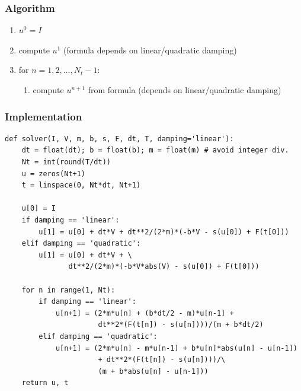 \documentclass{beamer}
\begin{document}
\begin{frame}
\frametitle{Algorithm}

\begin{enumerate}
 \item $u^0=I$

 \item compute $u^1$ (formula depends on linear/quadratic damping)

 \item for $n=1,2,\ldots,N_t-1$:
\begin{enumerate}

   \item compute $u^{n+1}$ from formula (depends on linear/quadratic damping)
\end{enumerate}

\noindent
\end{enumerate}

\noindent
\end{frame}

\begin{frame}
\frametitle{Implementation}

\begin{verbatim}
def solver(I, V, m, b, s, F, dt, T, damping='linear'):
    dt = float(dt); b = float(b); m = float(m) # avoid integer div.
    Nt = int(round(T/dt))
    u = zeros(Nt+1)
    t = linspace(0, Nt*dt, Nt+1)

    u[0] = I
    if damping == 'linear':
        u[1] = u[0] + dt*V + dt**2/(2*m)*(-b*V - s(u[0]) + F(t[0]))
    elif damping == 'quadratic':
        u[1] = u[0] + dt*V + \ 
               dt**2/(2*m)*(-b*V*abs(V) - s(u[0]) + F(t[0]))

    for n in range(1, Nt):
        if damping == 'linear':
            u[n+1] = (2*m*u[n] + (b*dt/2 - m)*u[n-1] +
                      dt**2*(F(t[n]) - s(u[n])))/(m + b*dt/2)
        elif damping == 'quadratic':
            u[n+1] = (2*m*u[n] - m*u[n-1] + b*u[n]*abs(u[n] - u[n-1])
                      + dt**2*(F(t[n]) - s(u[n])))/\ 
                      (m + b*abs(u[n] - u[n-1]))
    return u, t
\end{verbatim}
\end{frame}
\end{document}
